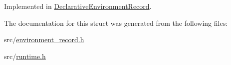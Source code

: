 Implemented in \hyperlink{struct_declarative_environment_record_aa1136051a94789af3f2f4b75f0266a04}{Declarative\+Environment\+Record}.



The documentation for this struct was generated from the following files\+:\begin{DoxyCompactItemize}
\item 
src/\hyperlink{environment__record_8h}{environment\+\_\+record.\+h}\item 
src/\hyperlink{runtime_8h}{runtime.\+h}\end{DoxyCompactItemize}
